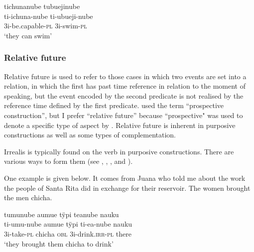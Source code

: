 \ea\label{ex:ABIL-REAL}
\begingl
\glpreamble tichunanube tubuejinube\\
\gla ti-ichuna-nube ti-ubueji-nube\\
\glb 3i-be.capable-\textsc{pl} 3i-swim-\textsc{pl}\\
\glft ‘they can swim’
\endgl
 \trailingcitation{[jxx-a120516l-a.570]}
\xe
{}

\subsubsection{Relative future}\label{sec:Prospectiveness}

Relative future is used to refer to those cases in which two events are set into a relation, in which the first has past time reference in relation to the moment of speaking, but the event encoded by the second predicate is not realised by the reference time defined by the first predicate. \citet[]{Michael2014} used the term “prospective construction”, but I prefer “relative future” because “prospective" was used to denote a specific type of aspect by \citet[64]{Comrie1976}. Relative future is inherent in purposive constructions as well as some types of complementation.

\hspace*{-2.8pt}Irrealis is typically found on the  verb in purposive constructions. There are various ways to form them (see , , , and ).

One example is given below. It comes from Juana who told me about the work the people of Santa Rita did in exchange for their reservoir. The women brought the men chicha.

\ea\label{ex:irr-purpi-1}
\begingl
\glpreamble tumunube aumue tÿpi teanube nauku\\
\gla ti-umu-nube aumue tÿpi ti-ea-nube nauku\\
\glb 3i-take-\textsc{pl} chicha \textsc{obl} 3i-drink.\textsc{irr}-\textsc{pl} there\\
\glft ‘they brought them chicha to drink’
\endgl
 \trailingcitation{[jxx-p120515l-2.183-184]}
\xe
{}

